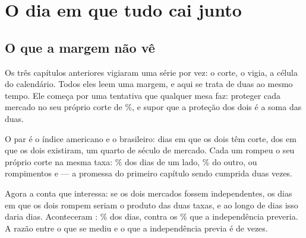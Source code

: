 %
%
%

\chapter{O dia em que tudo cai junto}
\label{cap:dependencia}

\section{O que a margem não vê}

Os três capítulos anteriores vigiaram uma série por vez: o corte, o vigia, a célula do
calendário. Todos eles leem uma margem, e aqui se trata de duas ao mesmo tempo. Ele começa por uma
tentativa que qualquer mesa faz: proteger cada mercado no seu próprio corte de
\numPromessaPct\%, e supor que a proteção dos dois é a soma das duas.

O par é o índice americano e o brasileiro: \numDependenciaDias{} dias em que os dois têm
corte, dos \numPedacoDiasComuns{} em que os dois existiram, um quarto de século de mercado. Cada um rompeu o seu próprio corte na mesma taxa: \numDependenciaTaxaAPct\% dos dias de um
lado, \numDependenciaTaxaBPct\% do outro, ou \numDependenciaRompeA{} rompimentos e
\numDependenciaRompeB{} --- a promessa do primeiro capítulo sendo cumprida duas vezes.

Agora a conta que interessa: se os dois mercados fossem independentes, os dias em que os dois
rompem seriam o produto das duas taxas, e ao longo de \numDependenciaDias{} dias isso daria
\numDependenciaEsperadoDias{} dias. Aconteceram \numDependenciaJuntos: \numDependenciaJuntosPct\%
dos dias, contra os \numDependenciaEsperadoPct\% que a independência preveria. A razão entre o que se mediu e o que a independência previa é de \numDependenciaExcesso{} vezes.


